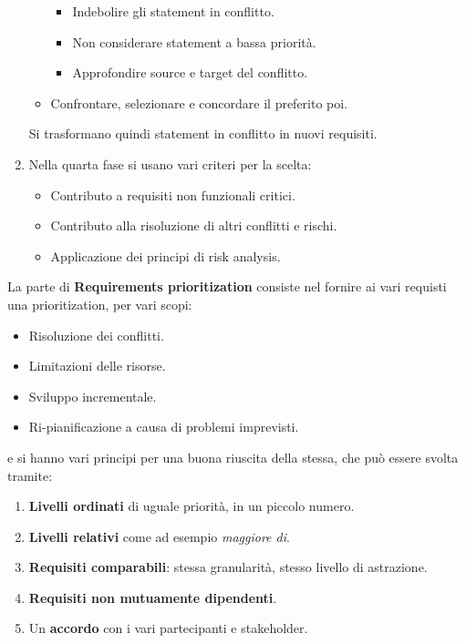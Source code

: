 \begin{enumerate}
\begin{itemize}
\begin{itemize}
                              \item Indebolire gli statement in conflitto.
                              \item Non considerare statement a bassa priorità.
                              \item Approfondire source e target del conflitto.
                        \end{itemize}
                  \item Confrontare, selezionare e concordare il preferito poi.
            \end{itemize}
            Si trasformano quindi statement in conflitto in nuovi requisiti.
      \item Nella quarta fase si usano vari criteri per la scelta:
            \begin{itemize}
                  \item Contributo a requisiti non funzionali critici.
                  \item Contributo alla risoluzione di altri conflitti e rischi.
                  \item Applicazione dei principi di risk analysis.
            \end{itemize}
\end{enumerate}
La parte di \textbf{Requirements prioritization} consiste nel fornire ai vari
requisti una prioritization, per vari scopi:
\begin{itemize}
      \item Risoluzione dei conflitti.
      \item Limitazioni delle risorse.
      \item Sviluppo incrementale.
      \item Ri-pianificazione a causa di problemi imprevisti.
\end{itemize}
e si hanno vari principi per una buona riuscita della stessa, che può essere
svolta tramite:
\begin{enumerate}
      \item \textbf{Livelli ordinati} di uguale priorità, in un piccolo numero.
      \item \textbf{Livelli relativi} come ad esempio \textit{maggiore di}.
      \item \textbf{Requisiti comparabili}: stessa granularità, stesso livello di
            astrazione.
      \item \textbf{Requisiti non mutuamente dipendenti}.
      \item Un \textbf{accordo} con i vari partecipanti e stakeholder.
\end{enumerate}

